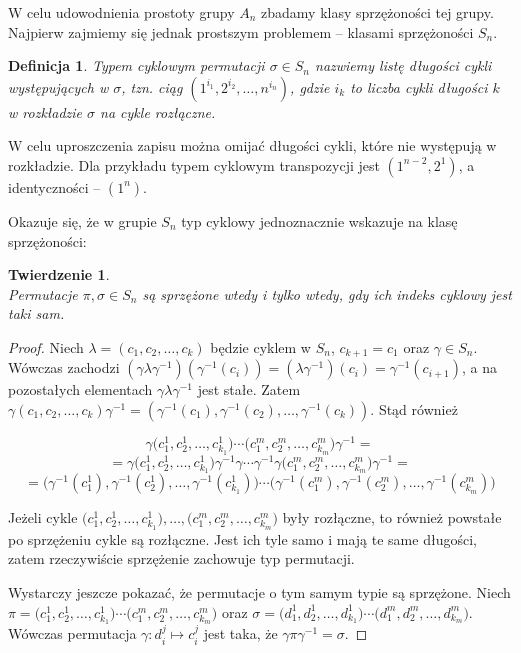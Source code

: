 \documentclass[licencjacka]{pracamgr}
\newtheorem{deff}{Definicja}[section]
\newtheorem{thh}{Twierdzenie}[section]
\begin{document}
W celu udowodnienia prostoty grupy $A_n$ zbadamy klasy
sprzężoności tej grupy. Najpierw zajmiemy się jednak prostszym
problemem -- klasami sprzężoności $S_n$.

\begin{deff}
    \emph{Typem cyklowym} permutacji $\sigma \in S_n$ nazwiemy listę długości cykli występujących w $\sigma$,
    tzn. ciąg $(1^{i_1}, 2^{i_2}, \ldots, n^{i_n})$,
    gdzie $i_k$ to liczba cykli długości $k$ w rozkładzie $\sigma$ na cykle rozłączne.
\end{deff}
W celu uproszczenia zapisu można omijać długości cykli, które nie
występują w rozkładzie. Dla przykładu typem cyklowym transpozycji
jest $(1^{n-2}, 2^1)$, a identyczności -- $(1^n)$.

Okazuje się, że w grupie $S_n$ typ cyklowy jednoznacznie wskazuje na
klasę sprzężoności:

\begin{thh} $ $ \\
    Permutacje $\pi, \sigma \in S_n$ są sprzężone wtedy i tylko wtedy, gdy ich indeks cyklowy jest taki sam.
\end{thh}
\begin{proof}
    Niech $\lambda = (c_1, c_2, \ldots, c_k)$ będzie cyklem w $S_n$, $c_{k+1} = c_1$ oraz $\gamma \in S_n$.
    Wówczas zachodzi 
    $(\gamma \lambda \gamma^{-1})(\gamma^{-1}(c_i)) = (\lambda \gamma^{-1})(c_i) = \gamma^{-1}(c_{i+1})$,
    a na pozostałych elementach $\gamma \lambda \gamma^{-1}$ jest stałe.
    Zatem $\gamma (c_1, c_2, \ldots, c_k) \gamma^{-1} = (\gamma^{-1}(c_1), \gamma^{-1}(c_2), \ldots, \gamma^{-1}(c_k))$.
    Stąd również

        $$\gamma \Big(c_1^1, c_2^1, \ldots, c_{k_1}^1\Big) \cdots \Big(c_1^m, c_2^m, \ldots, c_{k_m}^m \Big) \gamma^{-1} = $$
        $$ = \gamma \Big(c_1^1, c_2^1, \ldots, c_{k_1}^1\Big) \gamma^{-1} \gamma  \cdots \gamma ^{-1} \gamma \Big(c_1^m, c_2^m, \ldots, c_{k_m}^m\Big) \gamma^{-1} = $$
        $$ = \Big(\gamma^{-1} (c_1^1), \gamma^{-1} (c_2^1), \ldots, \gamma^{-1} (c_{k_1}^1)\Big) \cdots \Big(\gamma^{-1} (c_1^m), \gamma^{-1} (c_2^m), \ldots, \gamma^{-1} (c_{k_m}^m)\Big)$$

    Jeżeli cykle $\Big(c_1^1, c_2^1, \ldots, c_{k_1}^1\Big), \ldots, \Big(c_1^m, c_2^m, \ldots, c_{k_m}^m \Big)$ były rozłączne,
    to również powstałe po sprzężeniu cykle są rozłączne.
    Jest ich tyle samo i mają te same długości, zatem rzeczywiście sprzężenie zachowuje typ permutacji.

    Wystarczy jeszcze pokazać, że permutacje o tym samym typie są sprzężone.
    Niech $\pi =    \Big(c_1^1, c_2^1, \ldots, c_{k_1}^1\Big) \cdots \Big(c_1^m, c_2^m, \ldots, c_{k_m}^m \Big)$
    oraz  $\sigma = \Big(d_1^1, d_2^1, \ldots, d_{k_1}^1\Big) \cdots \Big(d_1^m, d_2^m, \ldots, d_{k_m}^m \Big)$.
    Wówczas permutacja $\gamma \colon d_i^j \mapsto c_i^j$ jest taka, że $\gamma \pi \gamma^{-1} = \sigma$.
\end{proof}
\end{document}
